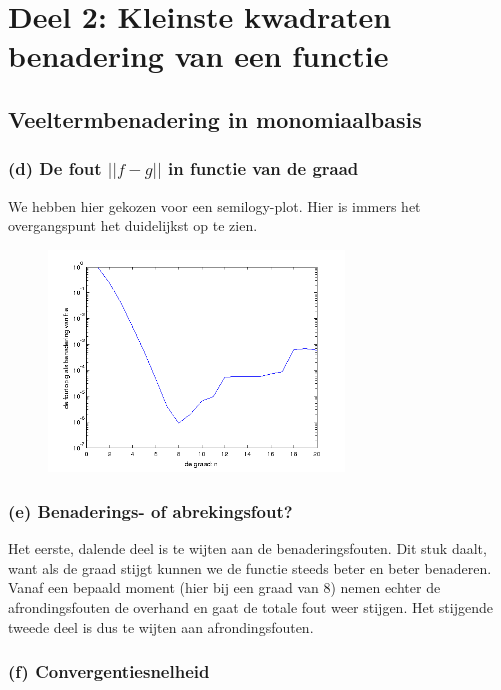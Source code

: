 \documentclass[11pt,a4paper]{article}
\begin{document}
\section{Deel 2: Kleinste kwadraten benadering van een functie}

\subsection{Veeltermbenadering in monomiaalbasis}

\subsubsection*{(d) De fout $||f-g||$ in functie van de graad}
We hebben hier gekozen voor een semilogy-plot. Hier is immers het overgangspunt het duidelijkst op te zien.
\begin{figure}[H]
\vspace{-35pt}
	\centering
	\includegraphics[width=0.7\textwidth]{22d1.png}
	\vspace{-10pt}
	\end{figure}

\subsubsection*{(e) Benaderings- of abrekingsfout?}

Het eerste, dalende deel is te wijten aan de benaderingsfouten. Dit stuk daalt, want als de graad stijgt kunnen we de functie steeds beter en beter benaderen. Vanaf een bepaald moment (hier bij een graad van 8) nemen echter de afrondingsfouten de overhand en gaat de totale fout weer stijgen. Het stijgende tweede deel is dus te wijten aan afrondingsfouten.
\vspace{-20pt}
\subsubsection*{(f) Convergentiesnelheid}
\end{document}
